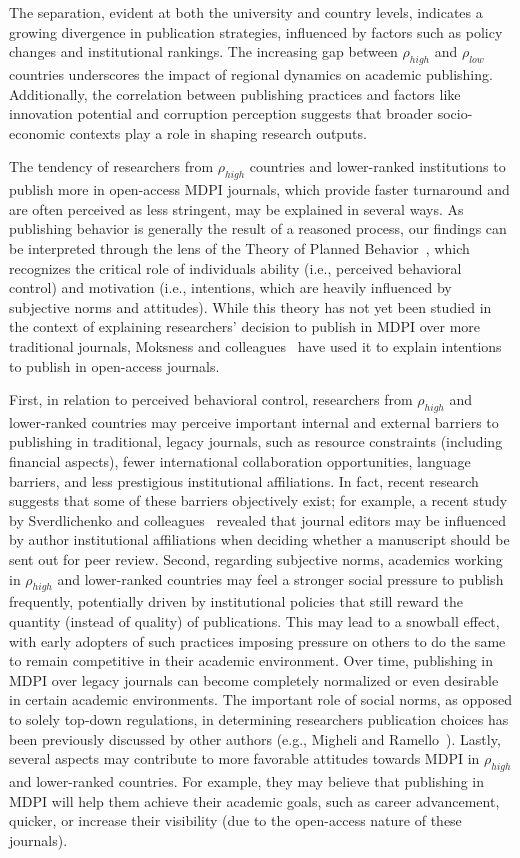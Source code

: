 \documentclass[amsfonts, amssymb, prl, superscriptaddress, notitlepage, twocolumn, nofootinbib]{revtex4-2}
\begin{document}
The separation, evident at both the university and country levels, indicates a growing divergence in publication strategies, influenced by factors such as policy changes and institutional rankings. The increasing gap between $\rho_{high}$ and $\rho_{low}$ countries underscores the impact of regional dynamics on academic publishing. Additionally, the correlation between publishing practices and factors like innovation potential and corruption perception suggests that broader socio-economic contexts play a role in shaping research outputs. 

The tendency of researchers from $\rho_{high}$ countries and lower-ranked institutions to publish more in open-access MDPI journals, which provide faster turnaround and are often perceived as less stringent, may be explained in several ways. As publishing behavior is generally the result of a reasoned process, our findings can be interpreted through the lens of the Theory of Planned Behavior~\cite{ajzen1991}, which recognizes the critical role of individuals ability (i.e., perceived behavioral control) and motivation (i.e., intentions, which are heavily influenced by subjective norms and attitudes). While this theory has not yet been studied in the context of explaining researchers’ decision to publish in MDPI over more traditional journals, Moksness and colleagues~\cite{moksness2020} have used it to explain intentions to publish in open-access journals.

First, in relation to perceived behavioral control, researchers from $\rho_{high}$ and lower-ranked countries may perceive important internal and external barriers to publishing in traditional, legacy journals, such as resource constraints (including financial aspects), fewer international collaboration opportunities, language barriers, and less prestigious institutional affiliations. In fact, recent research suggests that some of these barriers objectively exist; for example, a recent study by Sverdlichenko and colleagues~\cite{sverdlichenko2022} revealed that journal editors may be influenced by author institutional affiliations when deciding whether a manuscript should be sent out for peer review. Second, regarding subjective norms, academics working in $\rho_{high}$ and lower-ranked countries may feel a stronger social pressure to publish frequently, potentially driven by institutional policies that still reward the quantity (instead of quality) of publications. This may lead to a snowball effect, with early adopters of such practices imposing pressure on others to do the same to remain competitive in their academic environment. Over time, publishing in MDPI over legacy journals can become completely normalized or even desirable in certain academic environments. The important role of social norms, as opposed to solely top-down regulations, in determining researchers publication choices has been previously discussed by other authors (e.g., Migheli and Ramello~\cite{migheli2013}). Lastly, several aspects may contribute to more favorable attitudes towards MDPI in $\rho_{high}$ and lower-ranked countries. For example, they may believe that publishing in MDPI will help them achieve their academic goals, such as career advancement, quicker, or increase their visibility (due to the open-access nature of these journals).
\end{document}
